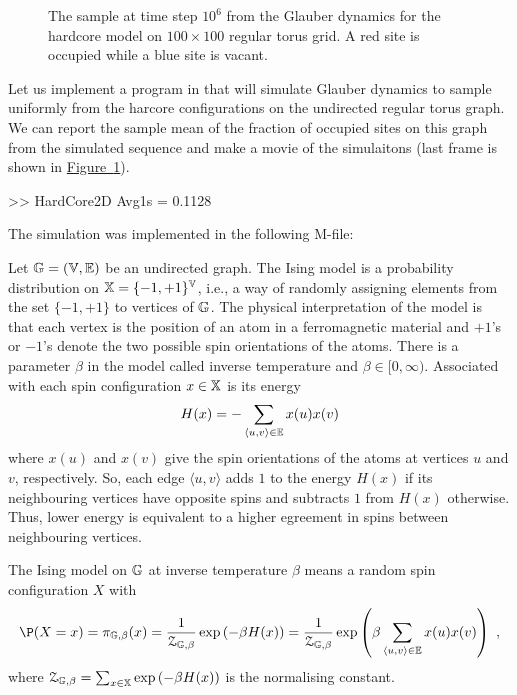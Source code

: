 \begin{figure}[htpb]
\caption{The sample at time step $10^6$ from the Glauber dynamics for the hardcore model on $100\times 100$ regular torus grid.  A red site is occupied while a blue site is vacant.\label{F:HardCore2D100x100Torus}}
\centering   {}
\end{figure}

\begin{simulation}
Let us implement a program in \Matlab that will simulate Glauber dynamics to sample uniformly from the harcore configurations on the undirected regular torus graph. 
We can report the sample mean of the fraction of occupied sites on this graph from the simulated sequence and make a movie of the simulaitons (last frame is shown in \hyperref[F:HardCore2D100x100Torus]{Figure~\ref*{F:HardCore2D100x100Torus}}).
\begin{VrbM}
>> HardCore2D
Avg1s =    0.1128
\end{VrbM}
The simulation was implemented in the following M-file:
\end{simulation}


\begin{model}\label{M:GlauberDynamicsIsing}
Let $\mathbb{G} = (\mathbb{V},\mathbb{E})$ be an undirected graph.  
The Ising model is a probability distribution on $\mathbb{X} = \{-1,+1\}^{\mathbb{V}}$, i.e., a way of randomly assigning elements from the set $\{-1,+1\}$ to vertices of $\mathbb{G}$.  
The physical interpretation of the model is that each vertex is the position of an atom in a ferromagnetic material and $+1$'s or $-1$'s denote the two possible spin orientations of the atoms.  
There is a parameter $\beta$ in the model called inverse temperature and $\beta \in [0,\infty)$.  
Associated with each spin configuration $x \in \mathbb{X}$ is its energy
\[
H(x) = - \sum_{\langle u, v \rangle \in \mathbb{E}} x(u) x(v) 
\]
where $x(u)$ and $x(v)$ give the spin orientations of the atoms at vertices $u$ and $v$, respectively.  
So, each edge $\langle u, v \rangle$ adds $1$ to the energy $H(x)$ if its neighbouring vertices have opposite spins and subtracts $1$ from $H(x)$ otherwise.  
Thus, lower energy is equivalent to a higher egreement in spins between neighbouring vertices.  

The Ising model on $\mathbb{G}$ at inverse temperature $\beta$ means a random spin configuration $X$ with
\[
\P(X=x) = \pi_{\Gz,\beta}(x) = \frac{1}{\mathcal{Z}_{\Gz,\beta}} \exp{\left(- \beta H(x)\right)} 
=  \frac{1}{\mathcal{Z}_{\Gz,\beta}} \exp{\left(\beta \sum_{\langle u, v \rangle \in \Ez} x(u) x(v)  \right)} \enspace , 
\]
where $\mathcal{Z}_{\mathbb{G},\beta}= \sum_{x \in \mathbb{X}}\exp{\left(- \beta H(x)\right)}$ is the normalising constant.
\end{model}

